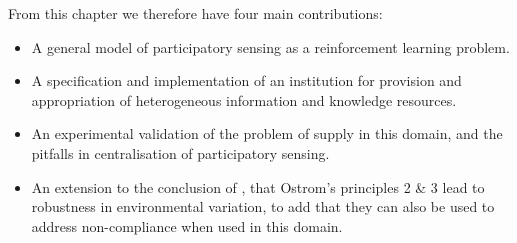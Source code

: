 From this chapter we therefore have four main contributions:
\begin{itemize}
\item A general model of participatory sensing as a reinforcement learning problem.
\item A specification and implementation of an institution for provision and appropriation of heterogeneous information and knowledge resources.
\item An experimental validation of the problem of supply in this domain, and the pitfalls in centralisation of participatory sensing.
\item An extension to the conclusion of \citet{Pitt2012}, that Ostrom's principles 2 \& 3 lead to robustness in environmental variation, to add that they can also be used to address non-compliance when used in this domain.
\end{itemize}


